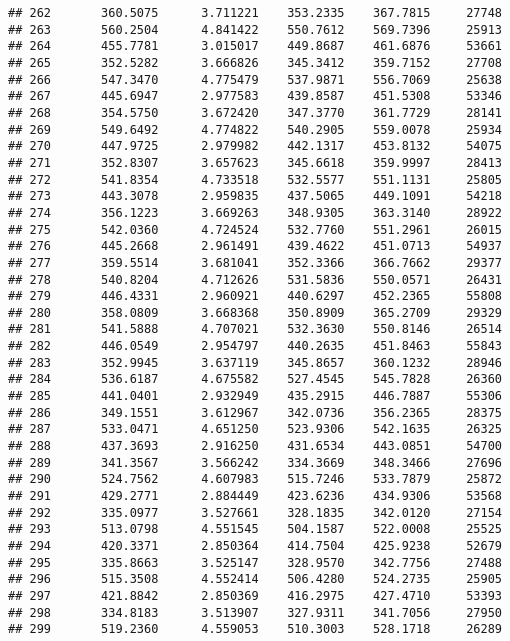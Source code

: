 \documentclass[]{article}
\begin{document}
\begin{verbatim}
## 262       360.5075      3.711221    353.2335    367.7815     27748
## 263       560.2504      4.841422    550.7612    569.7396     25913
## 264       455.7781      3.015017    449.8687    461.6876     53661
## 265       352.5282      3.666826    345.3412    359.7152     27708
## 266       547.3470      4.775479    537.9871    556.7069     25638
## 267       445.6947      2.977583    439.8587    451.5308     53346
## 268       354.5750      3.672420    347.3770    361.7729     28141
## 269       549.6492      4.774822    540.2905    559.0078     25934
## 270       447.9725      2.979982    442.1317    453.8132     54075
## 271       352.8307      3.657623    345.6618    359.9997     28413
## 272       541.8354      4.733518    532.5577    551.1131     25805
## 273       443.3078      2.959835    437.5065    449.1091     54218
## 274       356.1223      3.669263    348.9305    363.3140     28922
## 275       542.0360      4.724524    532.7760    551.2961     26015
## 276       445.2668      2.961491    439.4622    451.0713     54937
## 277       359.5514      3.681041    352.3366    366.7662     29377
## 278       540.8204      4.712626    531.5836    550.0571     26431
## 279       446.4331      2.960921    440.6297    452.2365     55808
## 280       358.0809      3.668368    350.8909    365.2709     29329
## 281       541.5888      4.707021    532.3630    550.8146     26514
## 282       446.0549      2.954797    440.2635    451.8463     55843
## 283       352.9945      3.637119    345.8657    360.1232     28946
## 284       536.6187      4.675582    527.4545    545.7828     26360
## 285       441.0401      2.932949    435.2915    446.7887     55306
## 286       349.1551      3.612967    342.0736    356.2365     28375
## 287       533.0471      4.651250    523.9306    542.1635     26325
## 288       437.3693      2.916250    431.6534    443.0851     54700
## 289       341.3567      3.566242    334.3669    348.3466     27696
## 290       524.7562      4.607983    515.7246    533.7879     25872
## 291       429.2771      2.884449    423.6236    434.9306     53568
## 292       335.0977      3.527661    328.1835    342.0120     27154
## 293       513.0798      4.551545    504.1587    522.0008     25525
## 294       420.3371      2.850364    414.7504    425.9238     52679
## 295       335.8663      3.525147    328.9570    342.7756     27488
## 296       515.3508      4.552414    506.4280    524.2735     25905
## 297       421.8842      2.850369    416.2975    427.4710     53393
## 298       334.8183      3.513907    327.9311    341.7056     27950
## 299       519.2360      4.559053    510.3003    528.1718     26289

\end{verbatim}
\end{document}
